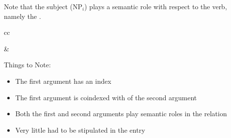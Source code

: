 \documentclass[a4paper,landscape,headrule,footrule]{foils}
\begin{document}
Note that the subject (NP$_i$) plays a semantic role with 
respect to the verb, namely the .


\begin{tabular}[t]{cc}
\begin{minipage}{0.5\linewidth}
  \footnotesize
  \end{minipage}
  &
\begin{minipage}{0.4\linewidth}
\small
Things to Note:
\begin{itemize}
\item The first argument has an index
\item The first argument is coindexed with  of the second argument
\item Both the first and  second arguments play 
semantic roles in the  relation
\item Very little had to be stipulated in the entry 
\end{itemize}
\end{minipage}
\end{tabular}
\end{document}
